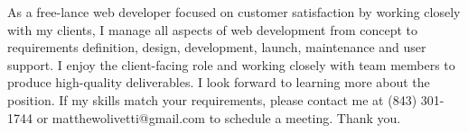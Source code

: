 \documentclass[11pt, a4paper]{awesome-cv}
\begin{document}
\begin{cvletter}
      
As a free-lance web developer focused on customer satisfaction by working closely with my clients, I manage all aspects of web development from concept to requirements definition, design, development, launch, maintenance and user support. I enjoy the client-facing role and working closely with team members to produce high-quality deliverables.
I look forward to learning more about the position. If my skills match your requirements, please contact me at (843) 301-1744 or matthewolivetti@gmail.com to schedule a meeting. Thank you.

\end{cvletter}

\makeletterclosing
\end{document}
